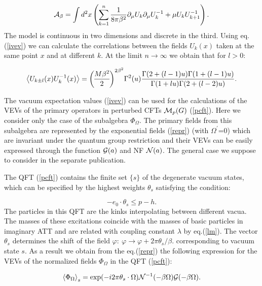 \documentclass[a4paper,12pt]{article}
\begin{document}
\begin{equation}
{\cal A}_\beta =\int d^2x\left( \sum_{k=1}^n\frac 1{8\pi \beta ^2}\partial
_\mu U_k\partial _\mu U_k^{-1}+\mu U_kU_{k+1}^{-1}\right).  \label{xy}
\end{equation}
The model is continuous in two dimensions and discrete in the third. Using
eq.(\ref{ivev}) we can calculate the correlations between the fields 
$U_k(x)$ taken at the same point $x$ and at different $k.$ At the limit 
$n\rightarrow \infty $ we obtain that for $l>0$:

\begin{equation}
\left\langle U_{k\pm l}(x)U_k^{-1}(x)\right\rangle =
{M\beta ^2 \overwithdelims() 2}
^{2\beta ^2}\Gamma ^2(u)\frac{\Gamma (2+(l-1)u)\Gamma (1+(l-1)u)}{\Gamma
(1+lu)\Gamma (2+(l-2)u)}.  \label{cxy}
\end{equation}

The vacuum expectation values (\ref{ivev}) can be 
used for the calculations of the VEVs of the
primary operators in perturbed CFTs ${\cal M}_p(G)$ (\ref{pcft}). Here we
consider only the case of the subalgebra $\Phi _\Omega$. The primary fields
from this subalgebra are represented by the exponential fields (\ref{repr})
(with $\Omega^\prime$=0)
which are invariant under the quantum group restriction \cite{FLZ} and their
VEVs can be easily expressed through the function ${\cal G}(a)$ and NF 
${\cal N}(a)$. The general case we suppose to consider in the separate
publication.

The QFT (\ref{pcft}) contains the finite set $\{s\}$ of the degenerate
vacuum states, which can be specified by the highest weights $\theta _s$
satisfying the condition:

\begin{equation} 
-e_0\cdot \theta _s\leq p-h.  \label{iNql}
\end{equation}
The particles in
this QFT are the kinks interpolating between different vacua. The masses of
these excitations coincide with the masses of basic particles in imaginary
ATT and are related with coupling constant $\lambda $ by eq.(\ref{lm}). The
vector $\theta _s$ determines the shift of the field $\varphi :\ \varphi
\rightarrow \varphi +2\pi \theta _s/\beta $. corresponding to vacuum state $s$. 
As a result we obtain from the eq.(\ref{repr}) the following expression
for the VEVs of the normalized fields $\Phi _\Omega $ in the QFT (\ref{pcft}):

\begin{equation}
\left\langle \Phi _\Omega \right\rangle _s=\exp (-i2\pi \theta _s\cdot
\Omega ){\cal N}^{-1}(-\beta \Omega ){\cal G}(-\beta \Omega ).  \label{wv}
\end{equation}
\end{document}
